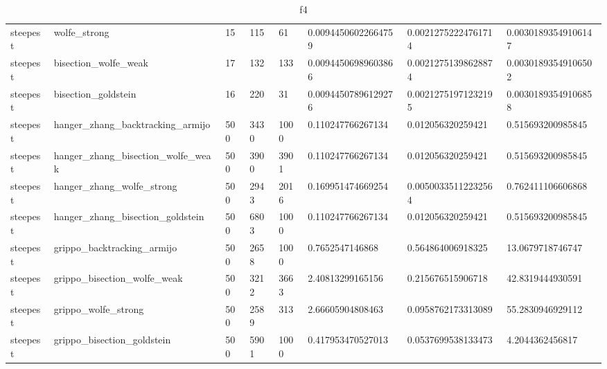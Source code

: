 \documentclass[a4paper,11pt]{article}
\numberwithin{equation}{section} %
\begin{document}
\begin{table}[h!]
{\begin{tabular}{|l|l|l|l|l|l|l|l|}
        steepest & wolfe\_strong & 15 & 115 & 61 & 0.00944506022664759 & 0.00212752224761714 & 0.00301893549106147 \\
        steepest & bisection\_wolfe\_weak & 17 & 132 & 133 & 0.00944506989603866 & 0.00212751398628874 & 0.00301893549106502 \\
        steepest & bisection\_goldstein & 16 & 220 & 31 & 0.00944507896129276 & 0.00212751971232195 & 0.00301893549106858 \\
        steepest & hanger\_zhang\_backtracking\_armijo & 500 & 3430 & 1000 & 0.110247766267134 & 0.012056320259421 & 0.515693200985845 \\
        steepest & hanger\_zhang\_bisection\_wolfe\_weak & 500 & 3900 & 3901 & 0.110247766267134 & 0.012056320259421 & 0.515693200985845 \\
        steepest & hanger\_zhang\_wolfe\_strong & 500 & 2943 & 2016 & 0.169951474669254 & 0.00500335112232564 & 0.762411106606868 \\
        steepest & hanger\_zhang\_bisection\_goldstein & 500 & 6803 & 1000 & 0.110247766267134 & 0.012056320259421 & 0.515693200985845 \\
        steepest & grippo\_backtracking\_armijo & 500 & 2658 & 1000 & 0.7652547146868 & 0.564864006918325 & 13.0679718746747 \\
        steepest & grippo\_bisection\_wolfe\_weak & 500 & 3212 & 3663 & 2.40813299165156 & 0.215676515906718 & 42.8319444930591 \\
        steepest & grippo\_wolfe\_strong & 500 & 2589 & 313 & 2.66605904808463 & 0.0958762173313089 & 55.2830946929112 \\
        steepest & grippo\_bisection\_goldstein & 500 & 5901 & 1000 & 0.417953470527013 & 0.0537699538133473 & 4.2044362456817 \\
\end{tabular}}
\caption{f4}
\label{table:f4}
\end{table}
\end{document}

